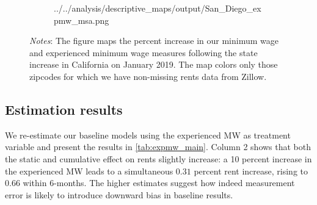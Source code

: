 \begin{figure}
\begin{subfigure}[b]{0.65\textwidth}
		{../../analysis/descriptive_maps/output/San_Diego_expmw_msa.png}
	\end{subfigure}
	\begin{minipage}{0.95\textwidth} \footnotesize
		\vspace{2mm} 
		\textit{Notes}: The figure maps the percent increase in our minimum wage and 
		experienced minimum wage measures following the state increase in California
		on January 2019. The map colors only those zipcodes for which we have 
		non-missing rents data from Zillow.
	\end{minipage}
\end{figure}


\subsection{Estimation results}

We re-estimate our baseline models using the experienced MW as treatment variable and present 
the results in \autoref{tab:expmw_main}. Column 2 shows that both the static and cumulative 
effect on rents slightly increase: a 10 percent increase in the experienced MW leads to a simultaneous
$0.31$ percent rent increase, rising to $0.66$ within 6-months. The higher estimates suggest how 
indeed measurement error is likely to introduce downward bias in baseline results.



